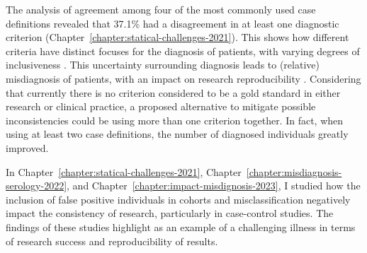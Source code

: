 The analysis of agreement among four of the most commonly used \cfs case definitions revealed that 37.1\% had a disagreement in at least one diagnostic criterion (Chapter~\ref{chapter:statical-challenges-2021}).
This shows how different criteria have distinct focuses for the diagnosis of patients, with varying degrees of inclusiveness \citep{lim2020ReviewCase}.
This uncertainty surrounding diagnosis leads to (relative) misdiagnosis of patients, with an impact on research reproducibility \citep{nacul2019HowHave}.
Considering that currently there is no criterion considered to be a gold standard in either research or clinical practice, a proposed alternative to mitigate possible inconsistencies could be using more than one criterion together.
In fact, when using at least two case definitions, the number of diagnosed individuals greatly improved.

In Chapter~\ref{chapter:statical-challenges-2021}, Chapter~\ref{chapter:misdiagnosis-serology-2022}, and Chapter~\ref{chapter:impact-misdignosis-2023}, I studied how the inclusion of false positive individuals in \cfs cohorts and misclassification negatively impact the consistency of research, particularly in case-control studies.
The findings of these studies highlight \cfs as an example of a challenging illness in terms of research success and reproducibility of results.


